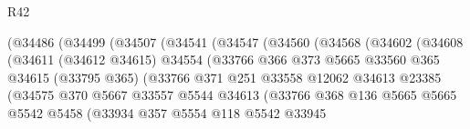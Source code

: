 \begin{lexlean}{R42}
\begin{coremodule}
                            (@34486
                              (@34499
                                (@34507
                                  (@34541
                                    (@34547
                                      (@34560
                                        (@34568
                                          (@34602
                                            (@34608
                                              (@34611
                                                (@34612 @34615)
                                                @34554
                                                (@33766
                                                  @366
                                                  @373
                                                  @5665
                                                  @33560
                                                  @365
                                                  @34615
                                                  (@33795 @365)
                                                  (@33766
                                                    @371
                                                    @251
                                                    @33558
                                                    @12062
                                                    @34613
                                                    @23385
                                                    (@34575
                                                      @370
                                                      @5667
                                                      @33557
                                                      @5544
                                                      @34613
                                                      (@33766
                                                        @368
                                                        @136
                                                        @5665
                                                        @5665
                                                        @5542
                                                        @5458
                                                        (@33934
                                                          @357
                                                          @5554
                                                          @118
                                                          @5542
                                                          @33945

\end{coremodule}
\end{lexlean}
